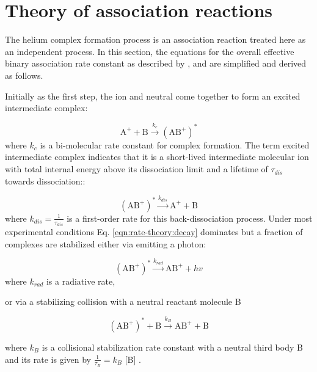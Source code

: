 \section{Theory of association reactions}
\label{subsec:rate-theory}

The helium complex formation process is an association reaction treated here as an independent  process. In this section, the equations for the overall effective binary association rate constant as described by \citet{gerlich_experimental_1992}, and \citet{bates_radiative_1988}  are simplified and derived as follows.

Initially as the first step, the ion and neutral come together to form an excited intermediate complex: 

\begin{equation}
    \text{A}^+ + \text{B} \xrightarrow{k_c} (\text{AB}^+) ^*
\end{equation}
where $k_c$ is a bi-molecular rate constant for complex formation. The term excited intermediate complex indicates that it is a short-lived intermediate molecular ion with total internal energy above its dissociation limit and a lifetime of $\tau_{dis}$  towards dissociation::

\begin{equation}
    (\text{AB}^+) ^* \xrightarrow{k_{dis}} \text{A}^+ + \text{B}
    \label{eqn:rate-theory:decay}
\end{equation}
where $k_{dis} = \frac{1}{\tau_{dis}}$ is a first-order rate for this back-dissociation process. Under most experimental conditions Eq. \ref{eqn:rate-theory:decay} dominates but a fraction of complexes are stabilized either via emitting a photon:

\begin{equation}
    (\text{AB}^+) ^* \xrightarrow{k_{rad}} \text{AB}^+ + hv
    \label{eqn:rate-theory:via-hv}
\end{equation}
where $k_{rad}$ is a radiative rate,

or via a stabilizing collision with a neutral reactant molecule B

\begin{equation}
    (\text{AB}^+) ^* + \text{B}\xrightarrow{k_{B}} \text{AB}^+ + \text{B}
    \label{eqn:rate-theory:via-He}
\end{equation}

where $k_{B}$ is a collisional stabilization rate constant with a neutral third body B and its rate is given by $\frac{1}{\tau_B} = k_{B}$ [B] .

